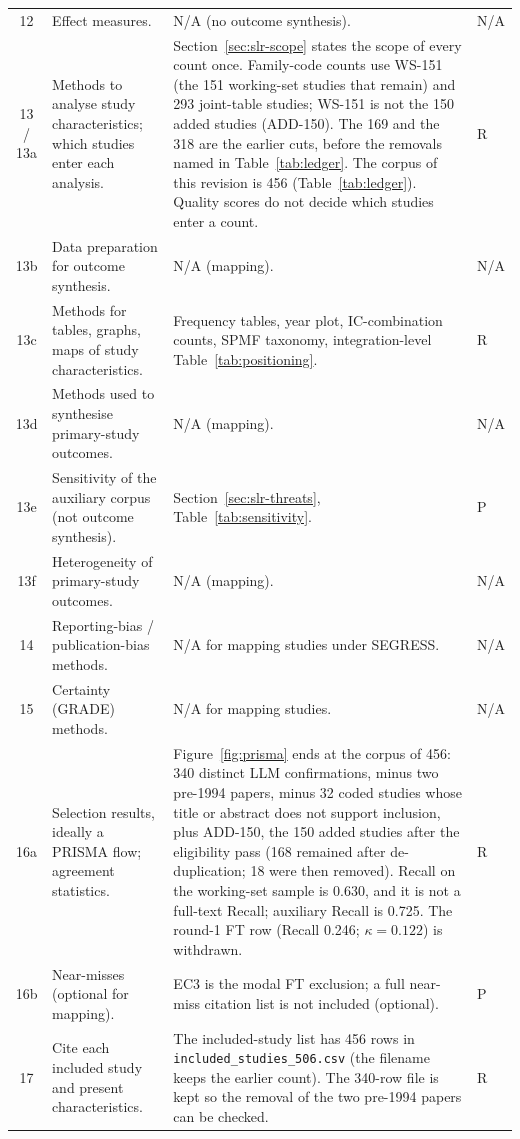 \begin{longtable}{c p{4.4cm} p{6.6cm} l}
12 & Effect measures. & N/A (no outcome synthesis). & N/A \\
13 / 13a & Methods to analyse study characteristics; which studies enter each analysis. & Section~\ref{sec:slr-scope} states the scope of every count once. Family-code counts use WS-151 (the 151 working-set studies that remain) and 293 joint-table studies; WS-151 is not the 150 added studies (ADD-150). The 169 and the 318 are the earlier cuts, before the removals named in Table~\ref{tab:ledger}. The corpus of this revision is 456 (Table~\ref{tab:ledger}). Quality scores do not decide which studies enter a count. & R \\
13b & Data preparation for outcome synthesis. & N/A (mapping). & N/A \\
13c & Methods for tables, graphs, maps of study characteristics. & Frequency tables, year plot, IC-combination counts, SPMF taxonomy, integration-level Table~\ref{tab:positioning}. & R \\
13d & Methods used to synthesise primary-study outcomes. & N/A (mapping). & N/A \\
13e & Sensitivity of the auxiliary corpus (not outcome synthesis). & Section~\ref{sec:slr-threats}, Table~\ref{tab:sensitivity}. & P \\
13f & Heterogeneity of primary-study outcomes. & N/A (mapping). & N/A \\
14 & Reporting-bias / publication-bias methods. & N/A for mapping studies under SEGRESS. & N/A \\
15 & Certainty (GRADE) methods. & N/A for mapping studies. & N/A \\
16a & Selection results, ideally a PRISMA flow; agreement statistics. & Figure~\ref{fig:prisma} ends at the corpus of 456: 340 distinct LLM confirmations, minus two pre-1994 papers, minus 32 coded studies whose title or abstract does not support inclusion, plus ADD-150, the 150 added studies after the eligibility pass (168 remained after de-duplication; 18 were then removed). Recall on the working-set sample is 0.630, and it is not a full-text Recall; auxiliary Recall is 0.725. The round-1 FT row (Recall 0.246; $\kappa = 0.122$) is withdrawn. & R \\
16b & Near-misses (optional for mapping). & EC3 is the modal FT exclusion; a full near-miss citation list is not included (optional). & P \\
17 & Cite each included study and present characteristics. & The included-study list has 456 rows in \texttt{included\_studies\_506.csv} (the filename keeps the earlier count). The 340-row file is kept so the removal of the two pre-1994 papers can be checked. & R \\

\end{longtable}
